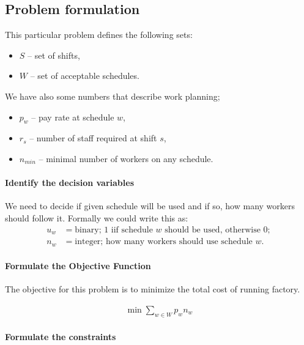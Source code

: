 \subsection{Problem formulation}

This particular problem defines the following sets: 

\begin{itemize}
  \item $S$ -- set of shifts,  
  \item $W$ -- set of acceptable schedules.
\end{itemize}

We have also some numbers that describe work planning;
\begin{itemize}
  \item $p_w$ -- pay rate at schedule $w$,
  \item $r_s$ -- number of staff required at shift $s$,
  \item $n_{min}$ -- minimal number of workers on any schedule.
\end{itemize}

\paragraph{Identify the decision variables}

We need to decide if given schedule will be used and if so, how many workers should follow it. Formally we could write this as:
\begin{align} 
  u_w &= \text{binary; 1 iif schedule $w$ should be used, otherwise 0}; \\
  n_w &= \text{integer; how many workers should use schedule $w$}.
\end{align} 

\paragraph{Formulate the Objective Function}

The objective for this problem is to minimize the total cost of running factory.

\begin{align}
   \min \mathop\sum\limits_{w \in W} p_w n_w
\end{align}

\paragraph{Formulate the constraints}

